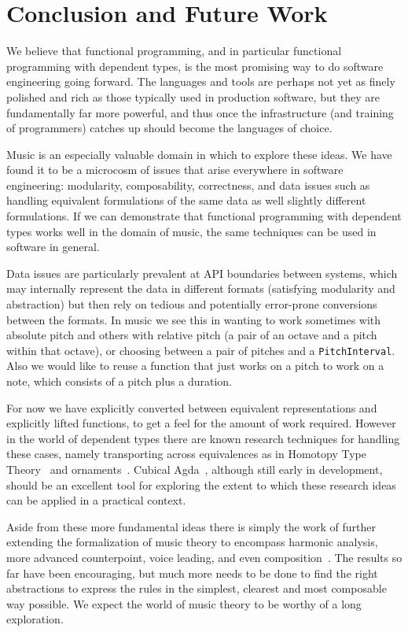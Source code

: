 \section{Conclusion and Future Work}
\label{sec:conclusion}

We believe that functional programming, and in particular functional
programming with dependent types, is the most promising way to do software
engineering going forward. The languages and tools are perhaps not yet
as finely polished and rich as those typically used in production
software, but they are fundamentally far more powerful, and thus once
the infrastructure (and training of programmers) catches up should
become the languages of choice.

Music is an especially valuable domain in which to explore these
ideas. We have found it to be a microcosm of issues that arise
everywhere in software engineering: modularity, composability,
correctness, and data issues such as handling equivalent formulations of
the same data as well slightly different formulations. If we can
demonstrate that functional programming with dependent types works
well in the domain of music, the same techniques can be used in
software in general.

Data issues are particularly prevalent at API boundaries between
systems, which may internally represent the data in different formats
(satisfying modularity and abstraction) but then rely on tedious and
potentially error-prone conversions between the formats. In music
we see this in wanting to work sometimes with absolute pitch and others
with relative pitch (a pair of an octave and a pitch within that
octave), or choosing between
a pair of pitches and a \texttt{PitchInterval}. Also we would like to
reuse a function that just works on a pitch to work on a note, which
consists of a pitch plus a duration.

For now we have explicitly converted between equivalent representations
and explicitly lifted functions, to get a feel for the amount of work
required.  However in the world of dependent types there are known
research techniques for handling these cases, namely transporting
across equivalences as in Homotopy Type Theory~\citep{hottbook} and
ornaments~\citep{dagand-ornaments}. Cubical
Agda~\citep{vezzosi-cubical}, although still early in development,
should be an excellent tool for exploring the extent to which these
research ideas can be applied in a practical context.

Aside from these more fundamental ideas there is simply the work of
further extending the formalization of music theory to encompass
harmonic analysis, more advanced counterpoint, voice leading, and even
composition~\citep{schoenberg-fundamentals}. The results so far have
been encouraging, but much more needs to be done to find the right
abstractions to express the rules in the simplest, clearest and most
composable way possible.
We expect the world of music theory to be worthy of a long exploration.

